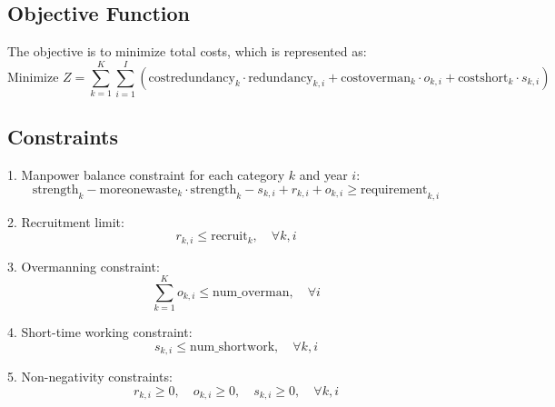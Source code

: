 \documentclass{article}
\begin{document}
\subsection*{Objective Function}
The objective is to minimize total costs, which is represented as:
\[
\text{Minimize } Z = \sum_{k=1}^{K} \sum_{i=1}^{I} \left( \text{costredundancy}_{k} \cdot \text{redundancy}_{k,i} + \text{costoverman}_{k} \cdot o_{k,i} + \text{costshort}_{k} \cdot s_{k,i} \right)
\]

\subsection*{Constraints}
1. Manpower balance constraint for each category \( k \) and year \( i \):
\[
\text{strength}_{k} - \text{moreonewaste}_{k} \cdot \text{strength}_{k} - s_{k,i} + r_{k,i} + o_{k,i} \geq \text{requirement}_{k,i}
\]

2. Recruitment limit:
\[
r_{k,i} \leq \text{recruit}_{k}, \quad \forall k, i
\]

3. Overmanning constraint:
\[
\sum_{k=1}^{K} o_{k,i} \leq \text{num\_overman}, \quad \forall i
\]

4. Short-time working constraint:
\[
s_{k,i} \leq \text{num\_shortwork}, \quad \forall k, i
\]

5. Non-negativity constraints:
\[
r_{k,i} \geq 0, \quad o_{k,i} \geq 0, \quad s_{k,i} \geq 0, \quad \forall k, i
\]
\end{document}
